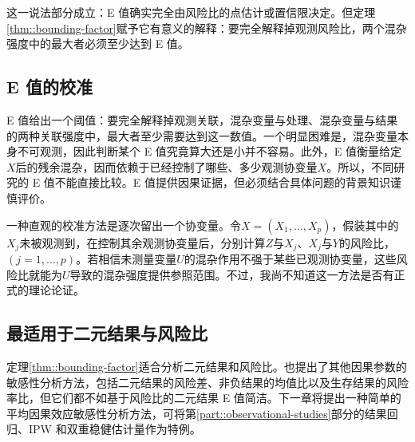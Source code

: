 这一说法部分成立：E 值确实完全由风险比的点估计或置信限决定。但定理\ref{thm::bounding-factor}赋予它有意义的解释：要完全解释掉观测风险比，两个混杂强度中的最大者必须至少达到 E 值。 







%
%


\subsection{E 值的校准}



E 值给出一个阈值：要完全解释掉观测关联，混杂变量与处理、混杂变量与结果的两种关联强度中，最大者至少需要达到这一数值。一个明显困难是，混杂变量本身不可观测，因此判断某个 E 值究竟算大还是小并不容易。此外，E 值衡量给定$X$后的残余混杂，因而依赖于已经控制了哪些、多少观测协变量$X$。所以，不同研究的 E 值不能直接比较。E 值提供因果证据，但必须结合具体问题的背景知识谨慎评价。 


一种直观的校准方法是逐次留出一个协变量。令$X = (X_1, \ldots, X_p)$，假装其中的$X_j$未被观测到，在控制其余观测协变量后，分别计算$Z$与$X_j$、$X_j$与$Y$的风险比，$(j=1, \ldots, p)$。若相信未测量变量$U$的混杂作用不强于某些已观测协变量，这些风险比就能为$U$导致的混杂强度提供参照范围。不过，我尚不知道这一方法是否有正式的理论论证。 



\subsection{最适用于二元结果与风险比}


定理\ref{thm::bounding-factor}适合分析二元结果和风险比。\citet{ding2016sensitivity}也提出了其他因果参数的敏感性分析方法，包括二元结果的风险差、非负结果的均值比以及生存结果的风险率比，但它们都不如基于风险比的二元结果 E 值简洁。下一章将提出一种简单的平均因果效应敏感性分析方法，可将第\ref{part::observational-studies}部分的结果回归、IPW 和双重稳健估计量作为特例。 





